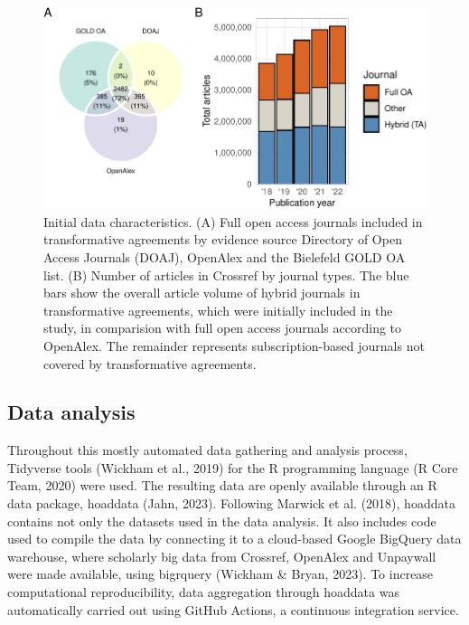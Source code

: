 \documentclass[a4paper,man,floatsintext,longtable,noextraspace,12pt]{apa6}
\begin{document}
\begin{figure}[ht!]

{\centering \includegraphics[width=0.99\linewidth,]{fig/method_fig-1} 

}

\caption{Initial data characteristics. (A) Full open access journals included in transformative agreements by evidence source Directory of Open Access Journals (DOAJ), OpenAlex and the Bielefeld GOLD OA list. (B) Number of articles in Crossref by journal types. The blue bars show the overall article volume of hybrid journals in transformative agreements, which were initially included in the study, in comparision with full open access journals according to OpenAlex. The remainder represents subscription-based journals not covered by transformative agreements.}\label{fig:method_fig}
\end{figure}

\hypertarget{data-analysis}{%
\subsection{Data analysis}\label{data-analysis}}

Throughout this mostly automated data gathering and analysis process,
Tidyverse tools (Wickham et al., 2019) for the R programming language (R
Core Team, 2020) were used. The resulting data are openly available
through an R data package, hoaddata (Jahn, 2023). Following Marwick et
al. (2018), hoaddata contains not only the datasets used in the data
analysis. It also includes code used to compile the data by connecting
it to a cloud-based Google BigQuery data warehouse, where scholarly big
data from Crossref, OpenAlex and Unpaywall were made available, using
bigrquery (Wickham \& Bryan, 2023). To increase computational
reproducibility, data aggregation through hoaddata was automatically
carried out using GitHub Actions, a continuous integration service.
\end{document}
